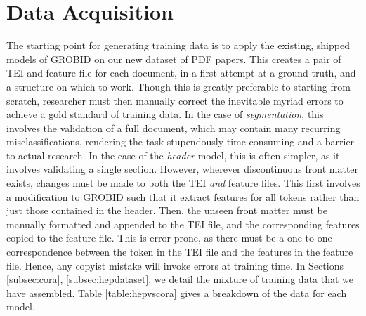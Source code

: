 
\section{Data Acquisition}
\label{sec:data}

The starting point for generating training data is to apply the existing, shipped models of GROBID on our new dataset of PDF papers. This creates a pair of TEI and feature file for each document, in a first attempt at a ground truth, and a structure on which to work. Though this is greatly preferable to starting from scratch, researcher must then manually correct the inevitable myriad errors to achieve a gold standard of training data. In the case of \emph{segmentation}, this involves the validation of a full document, which may contain many recurring misclassifications, rendering the task stupendously time-consuming and a barrier to actual research. In the case of the \emph{header} model, this is often simpler, as it involves validating a single section. However, wherever discontinuous front matter exists, changes must be made to both the TEI \emph{and} feature files. This first involves a modification to GROBID such that it extract features for all tokens rather than just those contained in the header. Then, the unseen front matter must be manually formatted and appended to the TEI file, and the corresponding features copied to the feature file. This is error-prone, as there must be a one-to-one correspondence between the token in the TEI file and the features in the feature file. Hence, any copyist mistake will invoke errors at training time. In Sections \ref{subsec:cora}, \ref{subsec:hepdataset}, we detail the mixture of training data that we have assembled. Table \ref{table:hepvscora} gives a breakdown of the data for each model.

